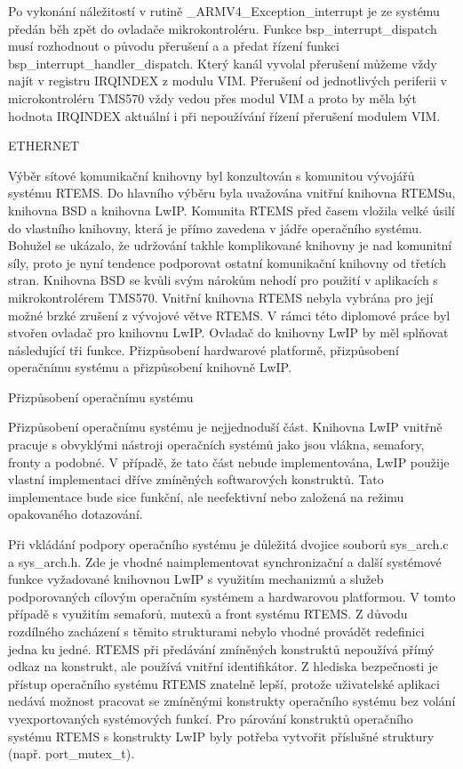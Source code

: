 Po vykonání náležitostí v rutině \_ARMV4\_Exception\_interrupt je ze systému předán běh zpět do ovladače mikrokontroléru.
Funkce bsp\_interrupt\_dispatch musí rozhodnout o původu přerušení a a předat řízení funkci bsp\_interrupt\_handler\_dispatch.
Který kanál vyvolal přerušení můžeme vždy najít v registru IRQINDEX z modulu VIM.
Přerušení od jednotlivých periferii v microkontroléru TMS570 vždy vedou přes modul VIM a proto by měla být hodnota IRQINDEX aktuální i při nepoužívání řízení přerušení modulem VIM.

\sec ETHERNET

	Výběr sítové komunikační knihovny byl konzultován s komunitou vývojářů systému RTEMS.
Do hlavního výběru byla uvažována vnitřní knihovna RTEMSu, knihovna BSD a knihovna LwIP.
Komunita RTEMS před časem vložila velké úsilí do vlastního knihovny, která je přímo zavedena v jádře operačního systému.
Bohužel se ukázalo, že udržování takhle komplikované knihovny je nad komunitní síly, proto je nyní tendence podporovat ostatní komunikační knihovny od třetích stran.
Knihovna BSD se kvůli svým nárokům nehodí pro použití v aplikacích s mikrokontrolérem TMS570.
Vnitřní knihovna RTEMS nebyla vybrána pro její možné brzké zrušení z vývojové větve RTEMS.
V rámci této diplomové práce byl stvořen ovladač pro knihovnu LwIP.
Ovladač do knihovny LwIP by měl splňovat následující tři funkce.
Přizpůsobení hardwarové platformě, přizpůsobení operačnímu systému a přizpůsobení knihovně LwIP. 

\secc Přizpůsobení operačnímu systému

Přizpůsobení operačnímu systému je nejjednoduší část.
Knihovna LwIP vnitřně pracuje s obvyklými nástroji operačních systémů jako jsou vlákna, semafory, fronty a podobné.
V případě, že tato část nebude implementována, LwIP použije vlastní implementaci dříve zmíněných softwarových konstruktů.
Tato implementace bude sice funkční, ale neefektivní nebo založená na režimu opakovaného dotazování.

Při vkládání podpory operačního systému je důležitá dvojice souborů sys\_arch.c a sys\_arch.h.{}
Zde je vhodné naimplementovat synchronizační a další systémové funkce vyžadované knihovnou LwIP s využitím mechanizmů a služeb podporovaných cílovým operačním systémem a hardwarovou platformou.
V tomto případě s využitím semaforů, mutexů a front systému RTEMS.
Z důvodu rozdílného zacházení s těmito strukturami nebylo vhodné provádět redefinici jedna ku jedné.
RTEMS při předávání zmíněných konstruktů nepoužívá přímý odkaz na konstrukt, ale používá vnitřní identifikátor.
Z hlediska bezpečnosti je přístup operačního systému RTEMS znatelně lepší, protože uživatelské aplikaci nedává možnost pracovat se zmíněnými konstrukty operačního systému bez volání vyexportovaných systémových funkcí.
Pro párování konstruktů operačního systému RTEMS s konstrukty LwIP byly potřeba vytvořit příslušné struktury (např. port\_mutex\_t).

